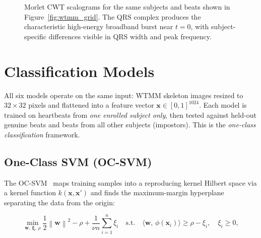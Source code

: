 \documentclass[12pt, a4paper]{article}
\newcommand{\norm}[1]{\left\lVert#1\right\rVert}
\begin{document}
\begin{figure}[H]
  \centering
  \caption{Morlet CWT scalograms for the same subjects and beats shown in
    Figure~\ref{fig:wtmm_grid}. The QRS complex produces the characteristic
    high-energy broadband burst near $t = 0$, with subject-specific
    differences visible in QRS width and peak frequency.}
  \label{fig:scalogram_grid}
\end{figure}

\section{Classification Models}
\label{sec:models}

All six models operate on the same input: WTMM skeleton images resized to
$32 \times 32$ pixels and flattened into a feature vector
$\mathbf{x} \in [0,1]^{1024}$.
Each model is trained on heartbeats from \textit{one enrolled subject only},
then tested against held-out genuine beats and beats from all other subjects
(impostors). This is the \textit{one-class classification} framework.

\subsection{One-Class SVM (OC-SVM)}

The OC-SVM~\cite{scholkopf2001} maps training samples into a reproducing
kernel Hilbert space via a kernel function $k(\mathbf{x}, \mathbf{x}')$
and finds the maximum-margin hyperplane separating the data from the origin:

\begin{mathbox}
\begin{equation}
  \min_{\mathbf{w},\, \boldsymbol{\xi},\, \rho}
  \frac{1}{2}\norm{\mathbf{w}}^2
  - \rho
  + \frac{1}{\nu n} \sum_{i=1}^{n} \xi_i
  \quad \text{s.t.} \quad
  \langle \mathbf{w},\, \phi(\mathbf{x}_i) \rangle \geq \rho - \xi_i,
  \quad \xi_i \geq 0,
  \label{eq:ocsvm}
\end{equation}
\end{mathbox}
\end{document}
